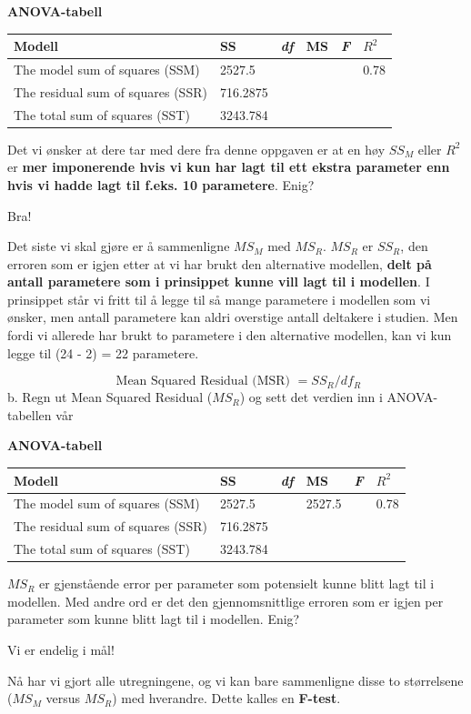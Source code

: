 \documentclass[
]{book}
\begin{document}
\textbf{ANOVA-tabell}

\begin{longtable}[]{@{}llllll@{}}
\toprule
Modell & SS & \emph{df} & MS & \emph{F} & \(R^2\)\tabularnewline
\midrule
\endhead
The model sum of squares (SSM) & 2527.5 & & & & 0.78\tabularnewline
The residual sum of squares (SSR) & 716.2875 & & & &\tabularnewline
The total sum of squares (SST) & 3243.784 & & & &\tabularnewline
\bottomrule
\end{longtable}

Det vi ønsker at dere tar med dere fra denne oppgaven er at en høy \(SS_M\) eller \(R^2\) er \textbf{mer imponerende hvis vi kun har lagt til ett ekstra parameter enn hvis vi hadde lagt til f.eks. 10 parametere}. Enig?

{Bra!}

Det siste vi skal gjøre er å sammenligne \(MS_M\) med \(MS_R\). \textbf{\(MS_R\)} er \(SS_R\), den erroren som er igjen etter at vi har brukt den alternative modellen, \textbf{delt på antall parametere som i prinsippet kunne vill lagt til i modellen}. I prinsippet står vi fritt til å legge til så mange parametere i modellen som vi ønsker, men antall parametere kan aldri overstige antall deltakere i studien. Men fordi vi allerede har brukt to parametere i den alternative modellen, kan vi kun legge til (24 - 2) = 22 parametere.

\[
\text{ Mean Squared Residual (MSR) }  = SS_R / df_R
\]
b. Regn ut Mean Squared Residual (\(MS_R\)) og sett det verdien inn i ANOVA-tabellen vår

\textbf{ANOVA-tabell}

\begin{longtable}[]{@{}llllll@{}}
\toprule
Modell & SS & \emph{df} & MS & \emph{F} & \(R^2\)\tabularnewline
\midrule
\endhead
The model sum of squares (SSM) & 2527.5 & & 2527.5 & & 0.78\tabularnewline
The residual sum of squares (SSR) & 716.2875 & & & &\tabularnewline
The total sum of squares (SST) & 3243.784 & & & &\tabularnewline
\bottomrule
\end{longtable}

\(MS_R\) er gjenstående error per parameter som potensielt kunne blitt lagt til i modellen. Med andre ord er det den gjennomsnittlige erroren som er igjen per parameter som kunne blitt lagt til i modellen. Enig?

{Vi er endelig i mål!}

Nå har vi gjort alle utregningene, og vi kan bare sammenligne disse to størrelsene (\(MS_M\) versus \(MS_R\)) med hverandre. Dette kalles en \textbf{F-test}.
\end{document}
